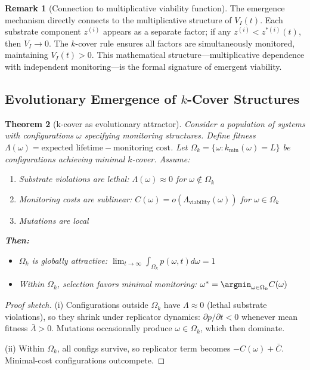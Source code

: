 \documentclass[11pt,a4paper]{article}
\newtheorem{theorem}{Theorem}[section]
\theoremstyle{definition}
\newtheorem{remark}[theorem]{Remark}
\begin{document}
\begin{remark}[Connection to multiplicative viability function]
The emergence mechanism directly connects to the multiplicative structure of $V_I(t)$. Each substrate component $z^{(i)}$ appears as a separate factor; if any $z^{(i)} < z^{*(i)}(t)$, then $V_I \to 0$. The $k$-cover rule ensures all factors are simultaneously monitored, maintaining $V_I(t) > 0$. This mathematical structure---multiplicative dependence with independent monitoring---is the formal signature of emergent viability.
\end{remark}

\subsection{Evolutionary Emergence of $k$-Cover Structures}

\begin{theorem}[k-cover as evolutionary attractor]\label{thm:evolution}
Consider a population of systems with configurations $\omega$ specifying monitoring structures. Define fitness $\Lambda(\omega) = \text{expected lifetime} - \text{monitoring cost}$. Let $\Omega_k = \{\omega : k_{\min}(\omega) = L\}$ be configurations achieving minimal $k$-cover. Assume:
\begin{enumerate}
\item Substrate violations are lethal: $\Lambda(\omega) \approx 0$ for $\omega \notin \Omega_k$
\item Monitoring costs are sublinear: $C(\omega) = o(\Lambda_{\text{viability}}(\omega))$ for $\omega \in \Omega_k$
\item Mutations are local
\end{enumerate}
\textbf{Then:}
\begin{itemize}
\item[(i)] $\Omega_k$ is globally attractive: $\lim_{t\to\infty} \int_{\Omega_k} p(\omega,t) d\omega = 1$
\item[(ii)] Within $\Omega_k$, selection favors minimal monitoring: $\omega^* = \argmin_{\omega\in\Omega_k} C(\omega)$
\end{itemize}
\end{theorem}

\begin{proof}[Proof sketch]
(i) Configurations outside $\Omega_k$ have $\Lambda \approx 0$ (lethal substrate violations), so they shrink under replicator dynamics: $\partial p/\partial t < 0$ whenever mean fitness $\bar{\Lambda} > 0$. Mutations occasionally produce $\omega \in \Omega_k$, which then dominate.

(ii) Within $\Omega_k$, all configs survive, so replicator term becomes $-C(\omega) + \bar{C}$. Minimal-cost configurations outcompete.
\end{proof}
\end{document}
